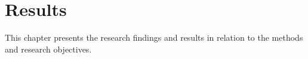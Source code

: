 

\chapter{Results} \label{results}

This chapter presents the research findings and results in relation to the methods and research objectives.
